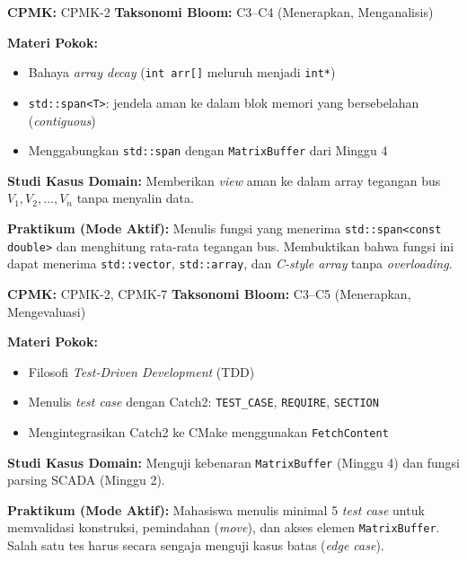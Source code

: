 \documentclass[12pt,a4paper]{article}
\begin{document}
\begin{tcolorbox}[colback=white, colframe=uniblue, title={\textbf{Minggu 5: \texttt{std::span} \& Akses Memori yang Aman}}, fonttitle=\bfseries\color{white}, coltitle=white, colbacktitle=uniblue]
\textbf{CPMK:} CPMK-2 \hfill \textbf{Taksonomi Bloom:} C3--C4 (Menerapkan, Menganalisis)

\textbf{Materi Pokok:}
\begin{itemize}[nosep]
    \item Bahaya \textit{array decay} (\texttt{int arr[]} meluruh menjadi \texttt{int*})
    \item \texttt{std::span<T>}: jendela aman ke dalam blok memori yang bersebelahan (\textit{contiguous})
    \item Menggabungkan \texttt{std::span} dengan \texttt{MatrixBuffer} dari Minggu 4
\end{itemize}

\textbf{Studi Kasus Domain:}
Memberikan \textit{view} aman ke dalam array tegangan bus $V_1, V_2, \ldots, V_n$ tanpa menyalin data.

\textbf{Praktikum (Mode Aktif):}
Menulis fungsi yang menerima \texttt{std::span<const double>} dan menghitung rata-rata tegangan bus. Membuktikan bahwa fungsi ini dapat menerima \texttt{std::vector}, \texttt{std::array}, dan \textit{C-style array} tanpa \textit{overloading}.
\end{tcolorbox}

\begin{tcolorbox}[colback=white, colframe=uniblue, title={\textbf{Minggu 6: Pengujian Otomatis (\textit{Unit Testing}) dengan Catch2}}, fonttitle=\bfseries\color{white}, coltitle=white, colbacktitle=uniblue]
\textbf{CPMK:} CPMK-2, CPMK-7 \hfill \textbf{Taksonomi Bloom:} C3--C5 (Menerapkan, Mengevaluasi)

\textbf{Materi Pokok:}
\begin{itemize}[nosep]
    \item Filosofi \textit{Test-Driven Development} (TDD)
    \item Menulis \textit{test case} dengan Catch2: \texttt{TEST\_CASE}, \texttt{REQUIRE}, \texttt{SECTION}
    \item Mengintegrasikan Catch2 ke CMake menggunakan \texttt{FetchContent}
\end{itemize}

\textbf{Studi Kasus Domain:}
Menguji kebenaran \texttt{MatrixBuffer} (Minggu 4) dan fungsi parsing SCADA (Minggu 2).

\textbf{Praktikum (Mode Aktif):}
Mahasiswa menulis minimal 5 \textit{test case} untuk memvalidasi konstruksi, pemindahan (\textit{move}), dan akses elemen \texttt{MatrixBuffer}. Salah satu tes harus secara sengaja menguji kasus batas (\textit{edge case}).
\end{tcolorbox}
\end{document}
